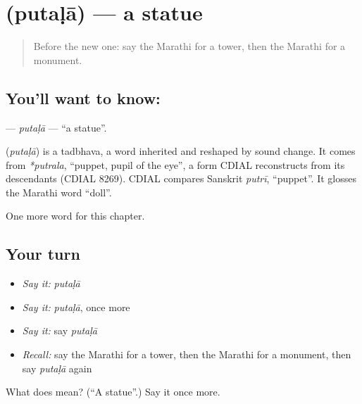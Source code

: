\section[\texorpdfstring{\mr{पुतळा} (putaḷā)}{पुतळा (putaḷā)}]{ (putaḷā) — a statue}

\label{lesson:MR-C183-putala}



\begin{quote}
Before the new one: say the Marathi for a tower, then the Marathi for a monument.
\end{quote}

\subsection*{You'll want to know: }
\textbf{} — \emph{putaḷā} — \textquotedblleft{}a statue\textquotedblright{}.

\begin{cousinweb}
\textbf{} (\emph{putaḷā}) is a tadbhava, a word inherited and reshaped by sound change. It comes from \emph{*putrala}, \textquotedblleft{}puppet, pupil of the eye\textquotedblright{}, a form CDIAL reconstructs from its descendants (CDIAL 8269). CDIAL compares Sanskrit \emph{putrī}, \textquotedblleft{}puppet\textquotedblright{}. It glosses the Marathi word \textquotedblleft{}doll\textquotedblright{}.
\end{cousinweb}

\begin{grammarlens}[title={What you've built}]
One more word for this chapter.
\end{grammarlens}

\subsection*{Your turn}
\begin{itemize}
\raggedright
  \item \emph{Say it:} \emph{putaḷā}
  \item \emph{Say it:} \emph{putaḷā}, once more
  \item \emph{Say it:} say \emph{putaḷā}
  \item \emph{Recall:} say the Marathi for a tower, then the Marathi for a monument, then say \emph{putaḷā} again
\end{itemize}

\begin{tcolorbox}[breakable,colback=teal!4,colframe=teal!35!black,title={Before you move on}]
What does  mean? (\textquotedblleft{}A statue\textquotedblright{}.) Say it once more.
\end{tcolorbox}
